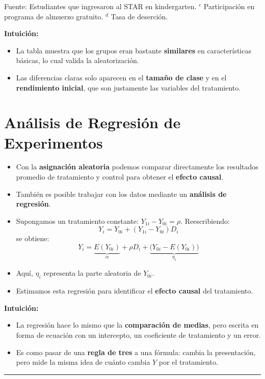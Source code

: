 \documentclass[12pt]{article}
\begin{document}
\footnotesize
Fuente: Estudiantes que ingresaron al STAR en kindergarten.  
$^c$ Participación en programa de almuerzo gratuito.  
$^d$ Tasa de deserción.  
\normalsize

\textbf{Intuición:}
\begin{itemize}
    \item La tabla muestra que los grupos eran bastante \textbf{similares} en características básicas, lo cual valida la aleatorización.
    \item Las diferencias claras solo aparecen en el \textbf{tamaño de clase} y en el \textbf{rendimiento inicial}, que son justamente las variables del tratamiento.
\end{itemize}


\section*{\noindent\textbf{Análisis de Regresión de Experimentos}}

\begin{itemize}
    \item Con la \textbf{asignación aleatoria} podemos comparar directamente los resultados promedio de tratamiento y control para obtener el \textbf{efecto causal}.
    \item También es posible trabajar con los datos mediante un \textbf{análisis de regresión}.
    \item Supongamos un tratamiento constante: $Y_{1i} - Y_{0i} = \rho$.  
    Reescribiendo:  
    \[
    Y_i = Y_{0i} + (Y_{1i} - Y_{0i})D_i
    \]
    se obtiene:
    \[
    Y_i = \underbrace{E(Y_{0i})}_{\alpha} + \rho D_i + \underbrace{\big(Y_{0i} - E(Y_{0i})\big)}_{\eta_i}
    \]
    \item Aquí, $\eta_i$ representa la parte aleatoria de $Y_{0i}$.
    \item Estimamos esta regresión para identificar el \textbf{efecto causal} del tratamiento.
\end{itemize}

\textbf{Intuición:}
\begin{itemize}
    \item La regresión hace lo mismo que la \textbf{comparación de medias}, pero escrita en forma de ecuación con un intercepto, un coeficiente de tratamiento y un error.
    \item Es como pasar de una \textbf{regla de tres} a una fórmula: cambia la presentación, pero mide la misma idea de cuánto cambia $Y$ por el tratamiento.
\end{itemize}
\hrule
\end{document}

